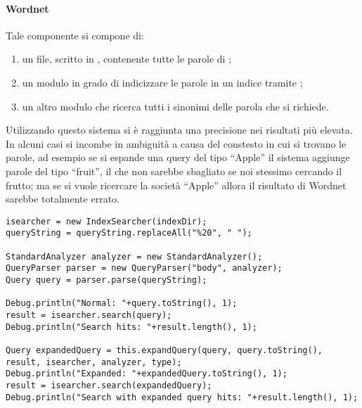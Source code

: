 \paragraph{Wordnet}
Tale componente si compone di:
\begin{enumerate}
\item un file, scritto in , contenente tutte le parole di ;
\item un modulo in grado di indicizzare le parole in un indice tramite ;
\item un altro modulo che ricerca tutti i sinonimi delle parola che si richiede.
\end{enumerate}
Utilizzando questo sistema si è raggiunta una precisione nei risultati più elevata. In alcuni casi si incombe in ambiguità a causa del constesto in cui si trovano le parole, ad esempio se si espande una query del tipo ``Apple'' il sistema aggiunge parole del tipo ``fruit'', il che non sarebbe sbagliato se noi stessimo cercando il frutto; ma se si vuole ricercare la società ``Apple'' allora il risultato di Wordnet sarebbe totalmente errato.
\begin{lstlisting}[frame=trBL]
isearcher = new IndexSearcher(indexDir);
queryString = queryString.replaceAll("%20", " ");

StandardAnalyzer analyzer = new StandardAnalyzer();
QueryParser parser = new QueryParser("body", analyzer);
Query query = parser.parse(queryString);

Debug.println("Normal: "+query.toString(), 1);
result = isearcher.search(query);
Debug.println("Search hits: "+result.length(), 1);

Query expandedQuery = this.expandQuery(query, query.toString(), result, isearcher, analyzer, type);
Debug.println("Expanded: "+expandedQuery.toString(), 1);
result = isearcher.search(expandedQuery);
Debug.println("Search with expanded query hits: "+result.length(), 1);
\end{lstlisting}

